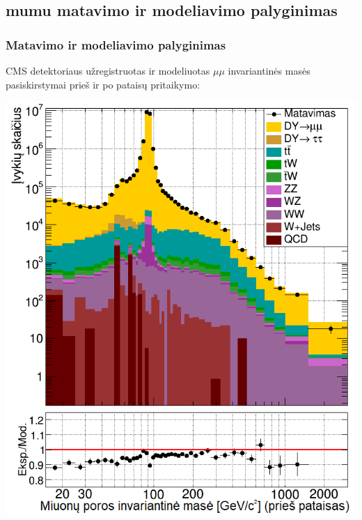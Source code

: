 \documentclass[xcolor=dvipsnames]{beamer}
\newcommand{\mumu}{\mu\mu}
\begin{document}
\begin{frame}
	\section{mumu matavimo ir modeliavimo palyginimas}
	\frametitle{Matavimo ir modeliavimo palyginimas}
	CMS detektoriaus užregistruotas ir modeliuotas $\mumu$ invariantinės masės pasiskirstymai prieš ir po pataisų pritaikymo:
	\begin{minipage}{0.49\textwidth}
		\includegraphics[width=\linewidth]{mumuMassBefore_SMALL.png}
	\end{minipage}
	\hfill
	\begin{minipage}{0.49\textwidth}

\end{minipage}
\end{frame}
\end{document}
